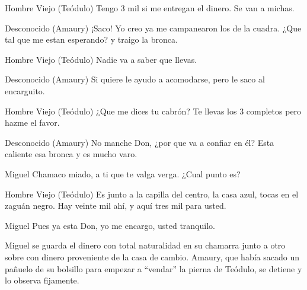 \begin{dialogue}{Hombre Viejo (Teódulo)}
Tengo 3 mil si me entregan el dinero. Se van a michas.
\end{dialogue}

\begin{dialogue}{Desconocido (Amaury)}
¡Saco! Yo creo ya me campanearon los de la cuadra. ¿Que tal que me estan esperando?  y traigo la bronca.  
\end{dialogue}

\begin{dialogue}{Hombre Viejo (Teódulo)}
Nadie va a saber que llevas.
\end{dialogue}

\begin{dialogue}{Desconocido (Amaury)}
Si quiere le ayudo a acomodarse, pero le saco al encarguito. 
\end{dialogue}

\begin{dialogue}{Hombre Viejo (Teódulo)}
¿Que me dices tu cabrón? Te llevas los 3 completos pero hazme el favor.
\end{dialogue}

\begin{dialogue}{Desconocido (Amaury)}
No manche Don, ¿por que va a confiar en él? Esta caliente esa bronca y es mucho varo. 
\end{dialogue}

\begin{dialogue}{Miguel}
Chamaco miado, a ti que te valga verga. 
¿Cual punto es?
\end{dialogue}

\begin{dialogue}{Hombre Viejo (Teódulo)}
Es junto a la capilla del centro, la casa azul, tocas en el zaguán negro. Hay veinte mil ahí, y aquí tres mil para usted.
\end{dialogue}

\begin{dialogue}{Miguel}
Pues ya esta Don, yo me encargo, usted tranquilo. 
\end{dialogue}

\begin{scenedesc}
Miguel se guarda el dinero con total naturalidad en su chamarra junto a otro sobre con dinero proveniente de la casa de cambio. 
Amaury, que había sacado un pañuelo de su bolsillo para empezar a ``vendar'' la pierna de Teódulo, se detiene y lo observa fijamente.
\end{scenedesc}

